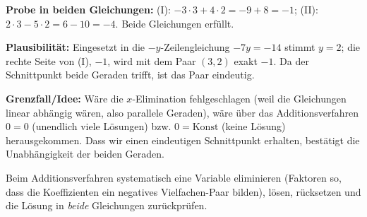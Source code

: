 \begin{kontrolle}
\textbf{Probe in beiden Gleichungen:} (I): $-3\cdot3+4\cdot2=-9+8=-1$;
(II): $2\cdot3-5\cdot2=6-10=-4$. Beide Gleichungen erfüllt.

\textbf{Plausibilität:} Eingesetzt in die $-y$-Zeilengleichung
$-7y=-14$ stimmt $y=2$; die rechte Seite von (I), $-1$, wird mit dem
Paar $(3,2)$ exakt $-1$. Da der Schnittpunkt beide Geraden trifft, ist
das Paar eindeutig.

\textbf{Grenzfall/Idee:} Wäre die $x$-Elimination fehlgeschlagen (weil die
Gleichungen linear abhängig wären, also parallele Geraden), w\"are über das
Additionsverfahren $0=0$ (unendlich viele L\"osungen) bzw. $0=\text{Konst}$
(keine Lösung) herausgekommen. Dass wir einen eindeutigen Schnittpunkt
erhalten, bestätigt die Unabh\"angigkeit der beiden Geraden.
\end{kontrolle}

\begin{merksatz}
Beim Additionsverfahren systematisch eine Variable eliminieren (Faktoren
so, dass die Koeffizienten ein negatives Vielfachen-Paar bilden), lösen,
rücksetzen und die Lösung in \emph{beide} Gleichungen zur\"uckpr\"ufen.
\end{merksatz}
